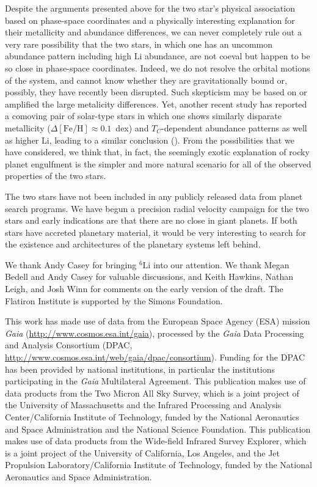 \documentclass[modern, letterpaper]{aastex61}
\newcommand*\elem[1]{\ensuremath{\mathrm{#1}}}
\newcommand*\elemH[1]{\ensuremath{[\mathrm{#1}/\elem{H}]}}
\newcommand*{\feh}{\ensuremath{\elemH{Fe}}}
\newcommand{\Tcondens}{\ensuremath{T_C}}
\begin{document}
Despite the arguments presented above for the two star's physical association
based on phase-space coordinates and a physically interesting explanation for
their metallicity and abundance differences, we can never completely rule out
a very rare possibility that the two stars, in which one has
an uncommon abundance pattern including high \elem{Li} abundance, are not coeval
but happen to be so close in phase-space coordinates.
Indeed, we do not resolve the orbital motions of the system, and cannot know
whether they are gravitationally bound or, possibly, they have recently been
disrupted.
Such skepticism may be based on or amplified the large metalicity
differences.
Yet, another recent study has reported a comoving pair of solar-type stars
in which one shows similarly disparate metallicity ($\Delta\feh
\approx 0.1$~dex) and \Tcondens-dependent abundance patterns as well as higher
\elem{Li}, leading to a similar conclusion (\citealt{2017A&A...604L...4S}).
From the possibilities that we have considered, we think that, in fact, the
seemingly exotic explanation of rocky planet engulfment is the simpler and more
natural scenario for all of the observed properties of the two stars.

The two stars have not been included in any publicly released data from planet
search programs.
We have begun a precision radial velocity campaign for the two stars and early
indications are that there are no close in giant planets.
If both stars have accreted planetary material, it would be very interesting to
search for the existence and architectures of the planetary systems left
behind.


\acknowledgements
We thank Andy Casey for bringing $^{6}\elem{Li}$ into our attention.
We thank Megan Bedell and Andy Casey for valuable discussions,
and Keith Hawkins, Nathan Leigh, and Josh Winn for comments
on the early version of the draft.
The Flatiron Institute is supported by the Simons Foundation.

This work has made use of data from the European Space Agency (ESA) mission
{\it Gaia} (\url{http://www.cosmos.esa.int/gaia}), processed by the {\it Gaia}
Data Processing and Analysis Consortium (DPAC,
\url{http://www.cosmos.esa.int/web/gaia/dpac/consortium}). Funding for the DPAC
has been provided by national institutions, in particular the institutions
participating in the {\it Gaia} Multilateral Agreement.
This publication makes use of data products from the Two Micron All Sky Survey,
which is a joint project of the University of Massachusetts and the Infrared
Processing and Analysis Center/California Institute of Technology, funded by
the National Aeronautics and Space Administration and the National Science
Foundation.
This publication makes use of data products from the Wide-field Infrared Survey
Explorer, which is a joint project of the University of California, Los
Angeles, and the Jet Propulsion Laboratory/California Institute of Technology,
funded by the National Aeronautics and Space Administration.
\end{document}
